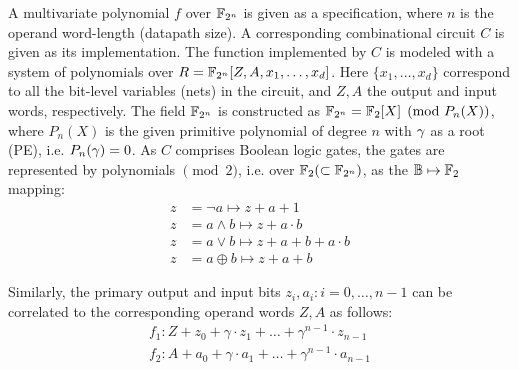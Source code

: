 A multivariate polynomial $f$ over ${\mathbb{F}}_{2^n}$ is given as a specification,
where $n$ is the operand word-length (datapath size). A corresponding
combinational circuit $C$ is given as its implementation. 
The function implemented by $C$ is modeled with a system of
polynomials over  $R={\mathbb{F}}_{2^n}[Z,A,x_1,\dots,x_d]$. Here $\{x_1, \dots,
x_d\}$ correspond to all the bit-level variables (nets) in the
circuit, and $Z,A$ the output and input words, respectively.  The
field ${\mathbb{F}}_{2^n}$ is constructed as ${\mathbb{F}}_{2^n} = {\mathbb{F}}_{2}[X]\pmod{P_n(X)}$, where
$P_n(X)$ is the given primitive polynomial of degree $n$
with $\gamma$ as a root (PE), i.e. $P_n(\gamma) =0$. 
As $C$ comprises Boolean logic gates, the gates are represented by
polynomials $\pmod{2}$, i.e. over ${\mathbb{F}}_2 (\subset {\mathbb{F}}_{2^n})$, as the
${\mathbb{B}}\mapsto {\mathbb{F}}_2$ mapping:
\begin{equation}
\label{bool2poly}
\begin{split}
z &=  \neg a \mapsto z+a+1\\
z &=  a \wedge b \mapsto z+a \cdot b\\
z &=  a \vee b \mapsto z+a+b+a \cdot b\\
z &=  a \oplus b \mapsto z+a+b
\end{split}
\end{equation}


Similarly, the primary output and input bits $z_i, a_i: i=0,\dots,n-1$ 
can be correlated to the corresponding operand words $Z,A$ as follows:
\begin{equation}
\label{ip-word-level}
\begin{split}
 f_1: Z + z_0 +\gamma \cdot  z_1 + \dots +\gamma^{n-1} \cdot z_{n-1}\\
 f_2: A + a_0 +\gamma \cdot a_1 + \dots +\gamma^{n-1} \cdot a_{n-1}
\end{split}
\end{equation}

